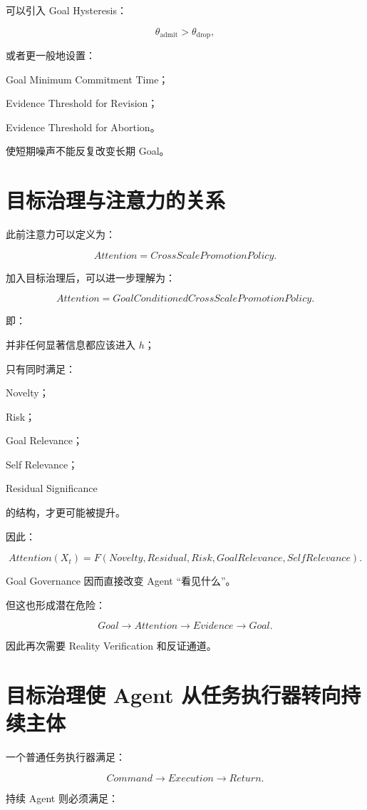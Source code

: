 可以引入 Goal Hysteresis：

\[
\theta_{\mathrm{admit}}
>
\theta_{\mathrm{drop}},
\]

或者更一般地设置：

Goal Minimum Commitment Time；

Evidence Threshold for Revision；

Evidence Threshold for Abortion。

使短期噪声不能反复改变长期 Goal。


\section{目标治理与注意力的关系}

此前注意力可以定义为：

\[
\boxed{
Attention
=
CrossScalePromotionPolicy.
}
\]

加入目标治理后，可以进一步理解为：

\[
\boxed{
Attention
=
GoalConditionedCrossScalePromotionPolicy.
}
\]

即：

并非任何显著信息都应该进入 $h$；

只有同时满足：

Novelty；

Risk；

Goal Relevance；

Self Relevance；

Residual Significance

的结构，才更可能被提升。

因此：

\[
Attention(X_t)
=
F(
Novelty,
Residual,
Risk,
GoalRelevance,
SelfRelevance
).
\]

Goal Governance 因而直接改变 Agent ``看见什么''。

但这也形成潜在危险：

\[
Goal
\rightarrow
Attention
\rightarrow
Evidence
\rightarrow
Goal.
\]

因此再次需要 Reality Verification 和反证通道。


\section{目标治理使 Agent 从任务执行器转向持续主体}

一个普通任务执行器满足：

\[
Command
\rightarrow
Execution
\rightarrow
Return.
\]

持续 Agent 则必须满足：

